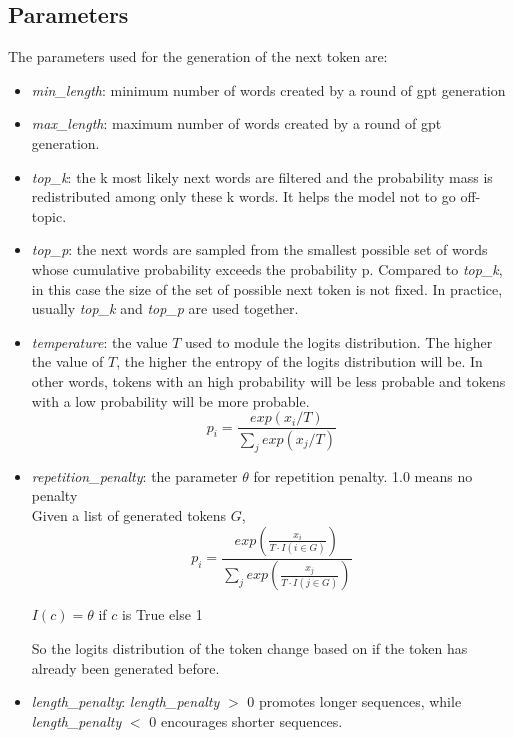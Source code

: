 \subsection{Parameters}
The parameters used for the generation of the next token are:
\begin{itemize}
    \item \textit{min\_length}: minimum number of words created by a round of gpt generation
    \item \textit{max\_length}: maximum number of words created by a round of gpt generation.  
    \item \textit{top\_k}: the k most likely next words are filtered and the probability mass is redistributed among only these k words. It helps the model not to go off-topic.
    \item \textit{top\_p}: the next words are sampled from the smallest possible set of words whose cumulative probability exceeds the probability p. Compared to \textit{top\_k}, in this case the size of the set of possible next token is not fixed. In practice, usually \textit{top\_k} and \textit{top\_p} are used together.
    \item \textit{temperature}: the value $T$ used to module the logits distribution. The higher the value of $T$, the higher the entropy of the logits distribution will be. In other words, tokens with an high probability will be less probable and tokens with a low probability will be more probable.
    \begin{equation*}
        p_i = \frac{exp(x_i/T)}{\sum_j exp(x_j/T)}   
    \end{equation*}
    \item \textit{repetition\_penalty}: the parameter $\theta$ for repetition penalty. 1.0 means no penalty \\
    Given a list of generated tokens $G$, 
     \begin{equation*}
        p_i = \frac{exp\left(\frac{x_i}{T \cdot I(i \in G)}\right)}{\sum_j exp\left(\frac{x_j}{T \cdot I(j \in G)}\right)}
    \end{equation*}
    \begin{center}
    $I(c) = \theta$ if $c$ is True else 1
    \end{center}    
    So the logits distribution of the token change based on if the token has already been generated before.

    \item \textit{length\_penalty}: \textit{length\_penalty} $>$ 0 promotes longer sequences, while \linebreak 
    \textit{length\_penalty} $<$ 0 encourages shorter sequences.


\end{itemize}
